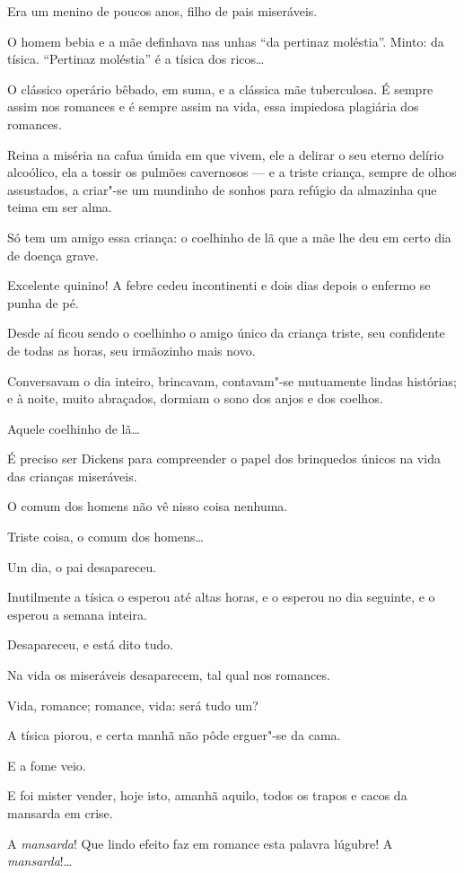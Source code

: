 Era um menino de poucos anos, filho de pais miseráveis.

O homem bebia e a mãe definhava nas unhas ``da pertinaz moléstia''.
Minto: da tísica. ``Pertinaz moléstia'' é a tísica dos ricos\ldots{}

O clássico operário bêbado, em suma, e a clássica mãe tuberculosa. É
sempre assim nos romances e é sempre assim na vida, essa impiedosa
plagiária dos romances.

Reina a miséria na cafua úmida em que vivem, ele a delirar o seu eterno
delírio alcoólico, ela a tossir os pulmões cavernosos --- e a triste
criança, sempre de olhos assustados, a criar"-se um mundinho de sonhos
para refúgio da almazinha que teima em ser alma.

Só tem um amigo essa criança: o coelhinho de lã que a mãe lhe deu em
certo dia de doença grave.

Excelente quinino! A febre cedeu incontinenti e dois dias depois o
enfermo se punha de pé.

Desde aí ficou sendo o coelhinho o amigo único da criança triste, seu
confidente de todas as horas, seu irmãozinho mais novo.

Conversavam o dia inteiro, brincavam, contavam"-se mutuamente lindas
histórias; e à noite, muito abraçados, dormiam o sono dos anjos e dos
coelhos.

Aquele coelhinho de lã\ldots{}

É preciso ser Dickens para compreender o papel dos brinquedos únicos na
vida das crianças miseráveis.

O comum dos homens não vê nisso coisa nenhuma.

Triste coisa, o comum dos homens\ldots{}

Um dia, o pai desapareceu.

Inutilmente a tísica o esperou até altas horas, e o esperou no dia
seguinte, e o esperou a semana inteira.

Desapareceu, e está dito tudo.

Na vida os miseráveis desaparecem, tal qual nos romances.

Vida, romance; romance, vida: será tudo um?

A tísica piorou, e certa manhã não pôde erguer"-se da cama.

E a fome veio.

E foi mister vender, hoje isto, amanhã aquilo, todos os trapos e cacos
da mansarda em crise.

A \emph{mansarda}! Que lindo efeito faz em romance esta palavra lúgubre!
A \emph{mansarda}!\ldots{}

